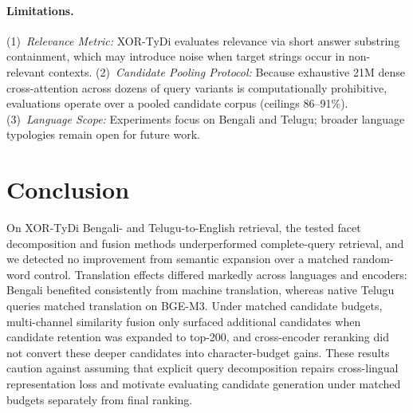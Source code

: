 \documentclass[11pt]{article}
\begin{document}
\paragraph{Limitations.} (1)~\emph{Relevance Metric:} XOR-TyDi evaluates relevance via short answer substring containment, which may introduce noise when target strings occur in non-relevant contexts. (2)~\emph{Candidate Pooling Protocol:} Because exhaustive 21M dense cross-attention across dozens of query variants is computationally prohibitive, evaluations operate over a pooled candidate corpus (ceilings 86--91\%). (3)~\emph{Language Scope:} Experiments focus on Bengali and Telugu; broader language typologies remain open for future work.

\section{Conclusion}
\label{sec:conclusion}

On XOR-TyDi Bengali- and Telugu-to-English retrieval, the tested facet decomposition and fusion methods underperformed complete-query retrieval, and we detected no improvement from semantic expansion over a matched random-word control. Translation effects differed markedly across languages and encoders: Bengali benefited consistently from machine translation, whereas native Telugu queries matched translation on BGE-M3. Under matched candidate budgets, multi-channel similarity fusion only surfaced additional candidates when candidate retention was expanded to top-200, and cross-encoder reranking did not convert these deeper candidates into character-budget gains. These results caution against assuming that explicit query decomposition repairs cross-lingual representation loss and motivate evaluating candidate generation under matched budgets separately from final ranking.


\end{document}
